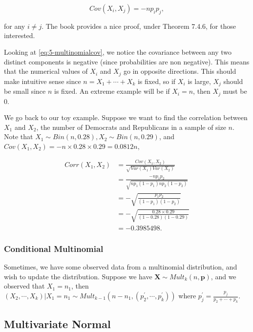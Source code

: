\documentclass[
]{book}
\begin{document}
\begin{equation} 
Cov(X_i, X_j) = -n p_i p_j,
\label{eq:5-multinomialcov}
\end{equation}

for any \(i \neq j\). The book provides a nice proof, under Theorem 7.4.6, for those interested.

Looking at \eqref{eq:5-multinomialcov}, we notice the covariance between any two distinct components is negative (since probabilities are non negative). This means that the numerical values of \(X_i\) and \(X_j\) go in opposite directions. This should make intuitive sense since \(n = X_1 + \cdots + X_k\) is fixed, so if \(X_i\) is large, \(X_j\) should be small since \(n\) is fixed. An extreme example will be if \(X_i = n\), then \(X_j\) must be 0.

We go back to our toy example. Suppose we want to find the correlation between \(X_1\) and \(X_2\), the number of Democrats and Republicans in a sample of size \(n\). Note that \(X_1 \sim Bin(n,0.28), X_2 \sim Bin(n,0.29)\), and \(Cov(X_1,X_2) = -n \times 0.28 \times 0.29 = 0.0812n\),

\[
\begin{split}
Corr(X_1,X_2) &= \frac{Cov(X_1,X_2)}{\sqrt{Var(X_1) Var(X_2)}}\\
 &= \frac{-n p_1 p_2}{\sqrt{n p_1 (1-p_1) n p_2 (1-p_2)}} \\
 &= -\sqrt{\frac{p_1 p_2}{(1-p_1)(1-p_2)}} \\
 &= -\sqrt{\frac{0.28 \times 0.29}{(1-0.28)(1-0.29)}} \\
 &= -0.3985498.
\end{split}
\]

\hypertarget{conditional-multinomial}{%
\subsubsection{Conditional Multinomial}\label{conditional-multinomial}}

Sometimes, we have some observed data from a multinomial distribution, and wish to update the distribution. Suppose we have \(\boldsymbol{X} \sim Mult_k(n, \boldsymbol{p})\), and we observed that \(X_1 = n_1\), then \((X_2, \cdots, X_k)|X_1 = n_1 \sim Mult_{k-1}(n-n_1, (p_2^{\prime}, \cdots, p_k^{\prime}))\) where \(p_j^{\prime} = \frac{p_j}{p_2 + \cdots + p_k}\).

\hypertarget{multivariate-normal}{%
\subsection{Multivariate Normal}\label{multivariate-normal}}
\end{document}
